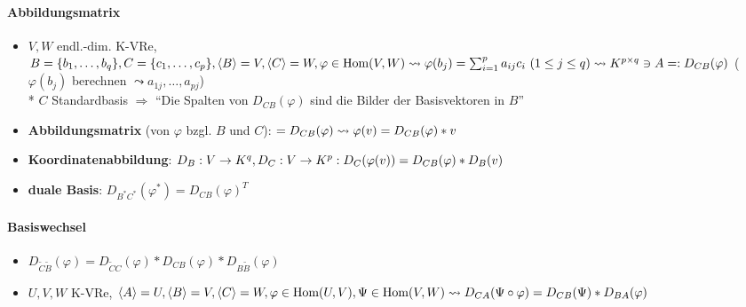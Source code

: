 \paragraph{Abbildungsmatrix}
\begin{itemize}
	\item $V,W$ endl.-dim. K-VRe, $B=\{ b_1, \dots, b_q \}, C=\{c_1, \dots, c_p \}, \\* \langle B \rangle = V, \langle C \rangle = W, \varphi \in \text{Hom}(V,W) \\* \leadsto \varphi(b_j)=\sum_{i=1}^p a_{ij}c_i \ (1 \leq j \leq q) \\* \leadsto K^{p \times q} \ni A =: D_{CB}(\varphi)$ ($\varphi(b_j)$ berechnen $\leadsto a_{1j},\dots,a_{pj}$) \\* $C$ Standardbasis $\Rightarrow$ ``Die Spalten von $D_{CB}(\varphi)$ sind die Bilder der Basisvektoren in $B$''
	\item \textbf{Abbildungsmatrix} (von $\varphi$ bzgl. $B$ und $C$): $=D_{CB}(\varphi) \\* \leadsto \varphi(v)=D_{CB}(\varphi)*v$
	\item \textbf{Koordinatenabbildung}: $D_B: V \rightarrow K^q, D_C: V \rightarrow K^p: \\* D_C(\varphi(v))=D_{CB}(\varphi)*D_B(v)$
	\item \textbf{duale Basis}: $D_{B^*C^*}(\varphi^*) = D_{CB}(\varphi)^T$
\end{itemize}

\paragraph{Basiswechsel}
\begin{itemize}
	\item $D_{\tilde{C}\tilde{B}}(\varphi)=D_{\tilde{C}C}(\varphi)*D_{CB}(\varphi)*D_{B\tilde{B}}(\varphi)$
	\item $U,V,W$ K-VRe, $\langle A \rangle = U, \langle B \rangle = V, \langle C \rangle = W, \\* \varphi \in \text{Hom}(U,V), \Psi \in \text{Hom}(V,W) \\* \leadsto D_{CA}(\Psi \circ \varphi)=D_{CB}(\Psi)*D_{BA}(\varphi)$
\end{itemize}